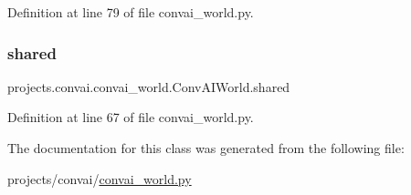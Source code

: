 Definition at line 79 of file convai\+\_\+world.\+py.

\mbox{\label{classprojects_1_1convai_1_1convai__world_1_1ConvAIWorld_a77e455138f285c6edaf494890a5dc774}} 
\subsubsection{\texorpdfstring{shared}{shared}}
{\footnotesize\ttfamily projects.\+convai.\+convai\+\_\+world.\+Conv\+A\+I\+World.\+shared}



Definition at line 67 of file convai\+\_\+world.\+py.



The documentation for this class was generated from the following file\+:\begin{DoxyCompactItemize}
\item 
projects/convai/\hyperlink{convai__world_8py}{convai\+\_\+world.\+py}\end{DoxyCompactItemize}
